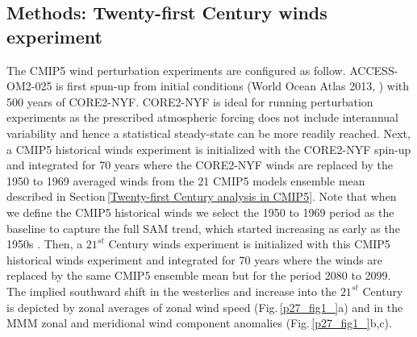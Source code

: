 \documentclass[draft,linenumbers]{agujournal2018}
\begin{document}
\subsection{Methods: Twenty-first Century winds experiment}
The CMIP5 wind perturbation experiments are configured as follow. ACCESS-OM2-025 is first spun-up from initial conditions (World Ocean Atlas 2013, \citealp{Boyer2013}) with 500 years of CORE2-NYF. CORE2-NYF is ideal for running perturbation experiments as the prescribed atmospheric forcing does not include interannual variability and hence a statistical steady-state can be more readily reached. Next, a CMIP5 historical winds experiment is initialized with the CORE2-NYF spin-up and integrated for 70 years where the CORE2-NYF winds are replaced by the 1950 to 1969 averaged winds from the 21 CMIP5 models ensemble mean described in Section\,\ref{Twenty-first Century analysis in CMIP5}. Note that when we define the CMIP5 historical winds we select the 1950 to 1969 period as the baseline to capture the full SAM trend, which started increasing as early as the 1950s \citep{Marshall2003}. Then, a $21^{st}$ Century winds experiment is initialized with this CMIP5 historical winds experiment and integrated for 70 years where the winds are replaced by the same CMIP5 ensemble mean but for the period 2080 to 2099. The implied southward shift in the westerlies and increase into the $21^{st}$ Century is depicted by zonal averages of zonal wind speed (Fig.\,\ref{p27_fig1_}a) and in the MMM zonal and meridional wind component anomalies (Fig.\,\ref{p27_fig1_}b,c). 
\end{document}
